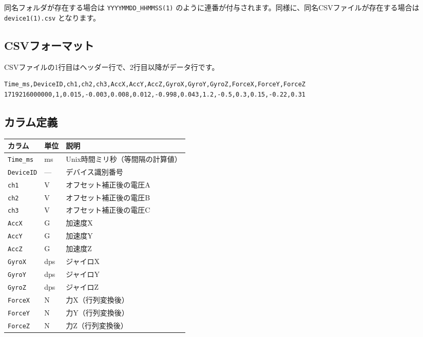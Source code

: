 \documentclass[a4paper,10pt]{ltjsarticle}
\begin{document}
同名フォルダが存在する場合は \texttt{YYYYMMDD\_HHMMSS(1)} のように連番が付与されます。同様に、同名CSVファイルが存在する場合は \texttt{device1(1).csv} となります。

\subsection{CSVフォーマット}

CSVファイルの1行目はヘッダー行で、2行目以降がデータ行です。

\begin{lstlisting}
Time_ms,DeviceID,ch1,ch2,ch3,AccX,AccY,AccZ,GyroX,GyroY,GyroZ,ForceX,ForceY,ForceZ
1719216000000,1,0.015,-0.003,0.008,0.012,-0.998,0.043,1.2,-0.5,0.3,0.15,-0.22,0.31
\end{lstlisting}

\subsection{カラム定義}

\begin{table}[h]
\centering
\begin{tabular}{lll}
\toprule
\textbf{カラム} & \textbf{単位} & \textbf{説明} \\
\midrule
\texttt{Time\_ms}  & ms  & Unix時間ミリ秒（等間隔の計算値） \\
\texttt{DeviceID}  & --- & デバイス識別番号 \\
\texttt{ch1}       & V   & オフセット補正後の電圧A \\
\texttt{ch2}       & V   & オフセット補正後の電圧B \\
\texttt{ch3}       & V   & オフセット補正後の電圧C \\
\texttt{AccX}      & G   & 加速度X \\
\texttt{AccY}      & G   & 加速度Y \\
\texttt{AccZ}      & G   & 加速度Z \\
\texttt{GyroX}     & dps & ジャイロX \\
\texttt{GyroY}     & dps & ジャイロY \\
\texttt{GyroZ}     & dps & ジャイロZ \\
\texttt{ForceX}    & N   & 力X（行列変換後） \\
\texttt{ForceY}    & N   & 力Y（行列変換後） \\
\texttt{ForceZ}    & N   & 力Z（行列変換後） \\
\bottomrule
\end{tabular}
\end{table}
\end{document}

